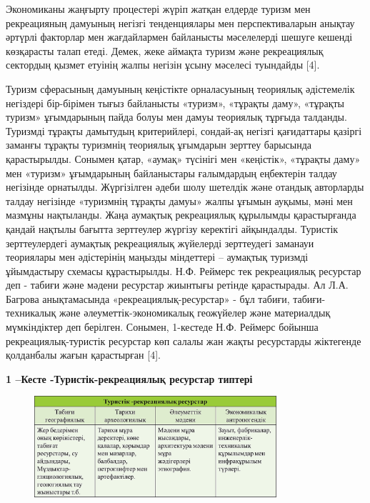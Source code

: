 Экономиканы жаңғырту процестері жүріп жатқан елдерде туризм мен
рекреацияның дамуының негізгі тенденциялары мен перспективаларын анықтау
әртүрлі факторлар мен жағдайлармен байланысты мәселелерді шешуге кешенді
көзқарасты талап етеді. Демек, жеке аймақта туризм және рекреациялық
сектордың қызмет етуінің жалпы негізін ұсыну мәселесі туындайды {[}4{]}.

Туризм сферасының дамуының кеңістікте орналасуының теориялық әдістемелік
негіздері бір-бірімен тығыз байланысты «туризм», «тұрақты даму»,
«тұрақты туризм» ұғымдарының пайда болуы мен дамуы теориялық тұрғыда
талданды. Туризмді тұрақты дамытудың критерийлері, сондай-ақ негізгі
қағидаттары қазіргі заманғы тұрақты туризмнің теориялық ұғымдарын
зерттеу барысында қарастырылды. Сонымен қатар, «аумақ» түсінігі мен
«кеңістік», «тұрақты даму» мен «туризм» ұғымдарының байланыстары
ғалымдардың еңбектерін талдау негізінде орнатылды. Жүргізілген әдеби
шолу шетелдік және отандық авторларды талдау негізінде «туризмнің
тұрақты дамуы» жалпы ұғымын ауқымы, мәні мен мазмұны нақтыланды. Жаңа
аумақтық рекреациялық құрылымды қарастырғанда қандай нақтылы бағытта
зерттеулер жүргізу керектігі айқындалды. Туристік зерттеулердегі
аумақтық рекреациялық жүйелерді зерттеудегі заманауи теориялары мен
әдістерінің маңызды міндеттері -- аумақтық туризмді ұйымдастыру схемасы
құрастырылды. Н.Ф. Реймерс тек рекреациялық ресурстар деп - табиғи және
мәдени ресурстар жиынтығы ретінде қарастырады. Ал Л.А. Багрова
анықтамасында «рекреациялық-ресурстар» - бұл табиғи, табиғи-техникалық
және әлеуметтік-экономикалық геожүйелер және материалдық мүмкіндіктер
деп берілген. Сонымен, 1-кестеде Н.Ф. Реймерс бойынша
рекреациялық-туристік ресурстар көп салалы жан жақты ресурстарды
жіктегенде қолданбалы жағын қарастырған {[}4{]}.

{\bfseries 1 --Кесте -Туристік-рекреaциялық ресурстар типтері}

\begin{figure}[H]
	\centering
	\includegraphics[width=0.8\textwidth]{assets/1110}
	\caption*{}
\end{figure}

